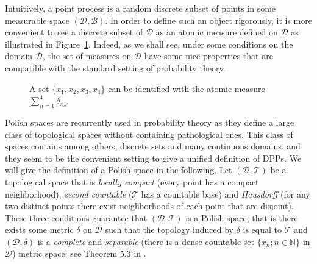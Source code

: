 \documentclass[twoside,11pt]{book}
\numberwithin{theorem}{chapter}
\numberwithin{definition}{chapter}
\numberwithin{proposition}{chapter}
\numberwithin{corollary}{chapter}
\numberwithin{example}{chapter}
\numberwithin{lemma}{chapter}
\numberwithin{assumption}{chapter}
\numberwithin{equation}{chapter}
\numberwithin{figure}{chapter}
\begin{document}
Intuitively, a point process is a random discrete subset of points in some  measurable space $(\mathcal{D}, \mathcal{B})$. In order to define such an object rigorously, it is more convenient to see a discrete subset of $\mathcal{D}$ as an atomic measure defined on $\mathcal{D}$ as illustrated in Figure~\ref{fig:pointprocess}. Indeed, as we shall see, under some conditions on the domain $\mathcal{D}$, the set of measures on $\mathcal{D}$ have some nice properties that are compatible with the standard setting of probability theory. 


\begin{figure}[]
\centering

 \caption{ A set $\{x_1, x_{2}, x_{3}, x_{4}\}$ can be identified with the atomic measure $\sum\limits_{n =1}^{4}\delta_{x_n}$. \label{fig:pointprocess}}
\end{figure}






Polish spaces are recurrently used in probability theory as they define a large class of topological spaces without containing pathological ones. 
This class of spaces contains among others, discrete sets and many continuous domains, and they seem to be the convenient setting to give a unified definition of DPPs. We will give the definition of a Polish space in the following. Let $(\mathcal{D},\mathcal{T})$ be a topological space that is \emph{locally compact} (every point has a compact neighborhood), \emph{second countable} ($\mathcal{T}$ has a countable base) and \emph{Hausdorff} (for any two distinct points there exist neighborhoods of each point that are disjoint).
 These three conditions guarantee that $(\mathcal{D},\mathcal{T})$ is a Polish space, that is there exists some metric $\delta$ on $\mathcal{D}$ such that the
topology induced by $\delta$ is equal to $\mathcal{T}$ and $(\mathcal{D},\delta)$ is a \emph{complete} and \emph{separable} (there is a dense countable set $\{x_{n}; n \in \mathbb{N}\}$ in $\mathcal{D}$)
metric space; see Theorem 5.3 in \citep{Kec95}.
\end{document}
